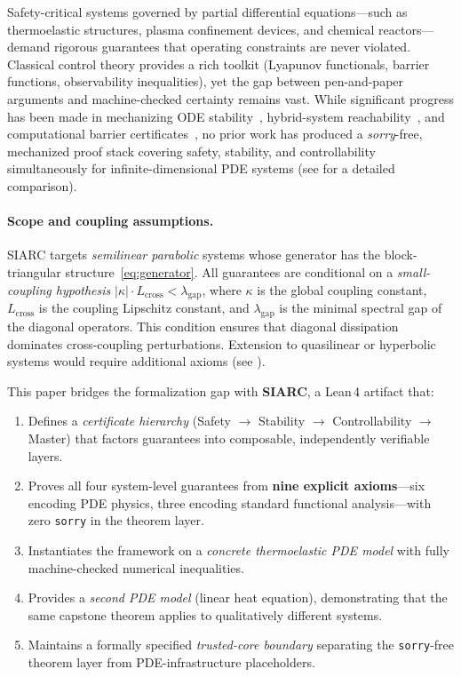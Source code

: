\documentclass[11pt,a4paper]{article}
\theoremstyle{plain}
\theoremstyle{definition}
\theoremstyle{remark}
\newcommand{\abs}[1]{\lvert #1 \rvert}
\newcommand{\kk}{\kappa}
\newcommand{\sorry}{\texttt{sorry}}
\begin{document}
Safety-critical systems governed by partial differential equations---such
as thermoelastic structures, plasma confinement devices, and chemical
reactors---demand rigorous guarantees that operating constraints are
never violated.  Classical control theory provides a rich toolkit
(Lyapunov functionals, barrier functions, observability inequalities),
yet the gap between pen-and-paper arguments and machine-checked certainty
remains vast.  While significant progress has been made in mechanizing
ODE stability~\cite{ImmlerODE}, hybrid-system reachability~\cite{PlatzerKeYmaera},
and computational barrier certificates~\cite{PrajnaBarrier,AmesSOS},
no prior work has produced a \emph{sorry}-free, mechanized proof stack
covering safety, stability, and controllability simultaneously for
infinite-dimensional PDE systems (see  for a detailed
comparison).

\paragraph{Scope and coupling assumptions.}
SIARC targets \emph{semilinear parabolic} systems whose generator has
the block-triangular structure~\eqref{eq:generator}.  All guarantees are
conditional on a \emph{small-coupling hypothesis}
$\abs{\kk} \cdot L_{\mathrm{cross}} < \lambda_{\mathrm{gap}}$, where
$\kk$ is the global coupling constant, $L_{\mathrm{cross}}$ is the
coupling Lipschitz constant, and $\lambda_{\mathrm{gap}}$ is the minimal
spectral gap of the diagonal operators.  This condition ensures that
diagonal dissipation dominates cross-coupling perturbations.  Extension
to quasilinear or hyperbolic systems would require additional axioms
(see ).

This paper bridges the formalization gap with \textbf{SIARC}, a Lean\,4
artifact that:

\begin{enumerate}[label=(\roman*)]
  \item Defines a \emph{certificate hierarchy} (Safety $\to$ Stability
    $\to$ Controllability $\to$ Master) that factors guarantees into
    composable, independently verifiable layers.
  \item Proves all four system-level guarantees from \textbf{nine explicit
    axioms}---six encoding PDE physics, three encoding standard
    functional analysis---with zero \sorry{} in the theorem layer.
  \item Instantiates the framework on a \emph{concrete thermoelastic
    PDE model} with fully machine-checked numerical inequalities.
  \item Provides a \emph{second PDE model} (linear heat equation),
    demonstrating that the same capstone theorem applies to
    qualitatively different systems.
  \item Maintains a formally specified \emph{trusted-core boundary}
    separating the \sorry{}-free theorem layer from PDE-infrastructure
    placeholders.
\end{enumerate}
\end{document}
